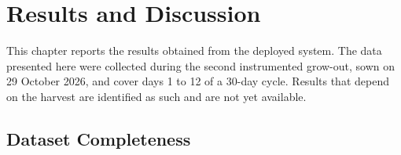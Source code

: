 %
%
%
%

\chapter{Results and Discussion}
\label{chap:results}

\ifpdf
    \graphicspath{{Chapter4/Figs/Raster/}{Chapter4/Figs/PDF/}{Chapter4/Figs/}}
\else
    \graphicspath{{Chapter4/Figs/Vector/}{Chapter4/Figs/}}
\fi

\newcommand{\pending}[1]{%
  \par\medskip\noindent\fbox{\parbox{0.96\linewidth}{\footnotesize\textbf{Data
  collection in progress.} #1}}\par\medskip}

This chapter reports the results obtained from the deployed system. The data
presented here were collected during the second instrumented grow-out, sown on
29 October 2026, and cover days 1 to 12 of a 30-day cycle. Results that depend
on the harvest are identified as such and are not yet available.

\section{Dataset Completeness}

